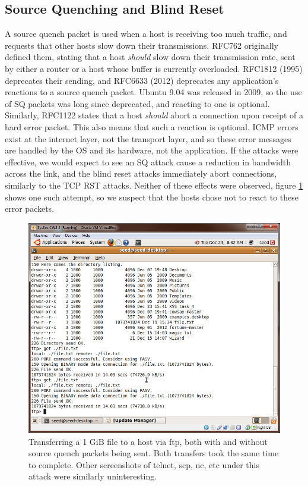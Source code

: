 \subsection{Source Quenching and Blind Reset}

A source quench packet is used when a host is receiving too much traffic, and requests that other hosts slow down their
transmissions. RFC762\cite{rfc762} originally defined them, stating that a host \emph{should} slow down their
transmission rate, sent by either a router or a host whose buffer is currently overloaded. RFC1812\cite{rfc1812} (1995)
deprecates their sending, and RFC6633\cite{rfc6633} (2012) deprecates any application's reactions to a source quench
packet. Ubuntu 9.04 was released in 2009, so the use of SQ packets was long since deprecated, and reacting to one is
optional. Similarly, RFC1122\cite{rfc1122} states that a host \emph{should} abort a connection upon receipt of a hard
error packet. This also means that such a reaction is optional. ICMP errors exist at the internet layer, not the
transport layer, and so these error messages are handled by the OS and its hardware, not the application. If the attacks
were effective, we would expect to see an SQ attack cause a reduction in bandwidth across the link, and the blind reset
attacks immediately abort connections, similarly to the TCP RST attacks.  Neither of these effects were observed, figure
\ref{fig:ftp_sq} shows one such attempt, so we suspect that the hosts chose not to react to these error packets.

\begin{figure}[h]
    \centering
    \includegraphics[width=.5\linewidth]{images/ftp_vs_sq.png}
    \caption{Transferring a 1 GiB file to a host via ftp, both with and without source quench packets being sent. Both
    transfers took the same time to complete. Other screenshots of telnet, scp, nc, etc under this attack were similarly
    uninteresting.}
    \label{fig:ftp_sq}
\end{figure}


